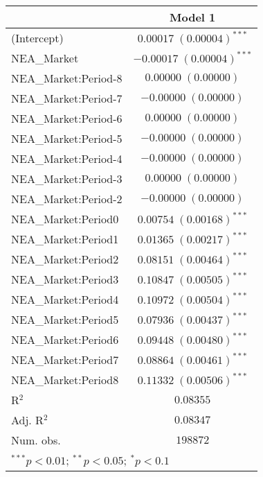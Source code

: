 
\begin{tabular}{l c}
\hline
 & Model 1 \\
\hline
(Intercept)          & $0.00017 \; (0.00004)^{***}$  \\
NEA\_Market          & $-0.00017 \; (0.00004)^{***}$ \\
NEA\_Market:Period-8 & $0.00000 \; (0.00000)$        \\
NEA\_Market:Period-7 & $-0.00000 \; (0.00000)$       \\
NEA\_Market:Period-6 & $0.00000 \; (0.00000)$        \\
NEA\_Market:Period-5 & $-0.00000 \; (0.00000)$       \\
NEA\_Market:Period-4 & $-0.00000 \; (0.00000)$       \\
NEA\_Market:Period-3 & $0.00000 \; (0.00000)$        \\
NEA\_Market:Period-2 & $-0.00000 \; (0.00000)$       \\
NEA\_Market:Period0  & $0.00754 \; (0.00168)^{***}$  \\
NEA\_Market:Period1  & $0.01365 \; (0.00217)^{***}$  \\
NEA\_Market:Period2  & $0.08151 \; (0.00464)^{***}$  \\
NEA\_Market:Period3  & $0.10847 \; (0.00505)^{***}$  \\
NEA\_Market:Period4  & $0.10972 \; (0.00504)^{***}$  \\
NEA\_Market:Period5  & $0.07936 \; (0.00437)^{***}$  \\
NEA\_Market:Period6  & $0.09448 \; (0.00480)^{***}$  \\
NEA\_Market:Period7  & $0.08864 \; (0.00461)^{***}$  \\
NEA\_Market:Period8  & $0.11332 \; (0.00506)^{***}$  \\
\hline
R$^2$                & $0.08355$                     \\
Adj. R$^2$           & $0.08347$                     \\
Num. obs.            & $198872$                      \\
\hline
\multicolumn{2}{l}{\scriptsize{$^{***}p<0.01$; $^{**}p<0.05$; $^{*}p<0.1$}}
\end{tabular}
